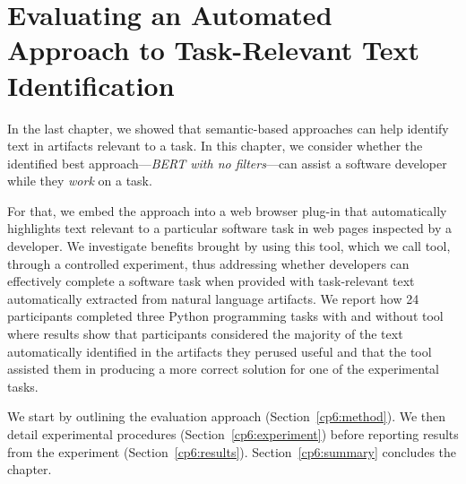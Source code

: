 \setcounter{chapter}{5}


\chapter{Evaluating an Automated Approach to Task-Relevant Text Identification}
\label{ch:assisting}


In the last chapter, we showed that semantic-based approaches can help identify text in artifacts relevant to a task. 
In this chapter, we consider whether the identified best approach---\textit{BERT with no filters}---can assist a software developer while they \textit{work} on a task.





For that, we embed the approach into a web browser plug-in that automatically highlights 
text relevant to a particular software task in web pages inspected by a developer.
We investigate benefits brought by using this tool, which we call \acs{tool}, through a controlled experiment,
thus addressing whether developers can effectively complete a software task 
when provided with task-relevant text automatically extracted from natural language artifacts. 
We report how  24 participants completed three Python programming tasks 
with and without \acs{tool}
where results show that participants considered the majority of the text automatically identified in the artifacts 
they perused useful and that 
the tool assisted them in producing a more correct solution for one of the experimental tasks.



We start by outlining the evaluation approach  (Section~\ref{cp6:method}). We then
detail experimental procedures  (Section~\ref{cp6:experiment}) before reporting
results from the experiment 
(Section~\ref{cp6:results}).
Section~\ref{cp6:summary} concludes the chapter.
















% 

